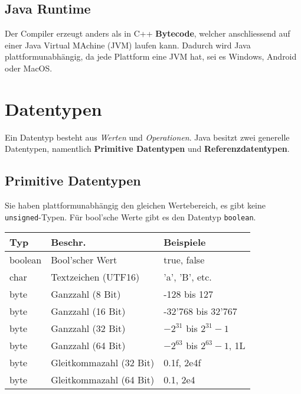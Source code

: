 \subsection{Java Runtime}
Der Compiler erzeugt anders als in C++ \textbf{Bytecode}, welcher anschliessend auf einer Java Virtual MAchine (JVM) laufen kann.
Dadurch wird Java plattformunabhängig, da jede Plattform eine JVM hat, sei es Windows, Android oder MacOS.


\section{Datentypen}

Ein Datentyp besteht aus \textit{Werten} und \textit{Operationen}. Java besitzt zwei generelle Datentypen, 
namentlich \textbf{Primitive Datentypen} und \textbf{Referenzdatentypen}.

\subsection{Primitive Datentypen}
Sie haben plattformunabhängig den gleichen Wertebereich, es gibt keine \verb|unsigned|-Typen. Für bool'sche Werte gibt es den Datentyp \verb|boolean|.

\begin{center}
    \begin{tabular}{lll}
        \rowcolor[RGB]{239,239,239} 
        \textbf{Typ} & \textbf{Beschr.}        & \textbf{Beispiele} \\ \hline
        boolean      & Bool'scher Wert         & true, false \\
        char         & Textzeichen (UTF16)     & 'a', 'B', etc. \\
        byte         & Ganzzahl (8 Bit)        & -128 bis 127 \\
        byte         & Ganzzahl (16 Bit)       & -32'768 bis 32'767 \\
        byte         & Ganzzahl (32 Bit)       & $ -2^{31} $ bis $ 2^{31}-1 $ \\
        byte         & Ganzzahl (64 Bit)       & $ -2^{63} $ bis $ 2^{63}-1 $, 1L \\
        byte         & Gleitkommazahl (32 Bit) & 0.1f, 2e4f \\
        byte         & Gleitkommazahl (64 Bit) & 0.1, 2e4 \\
    \end{tabular}
\end{center}

